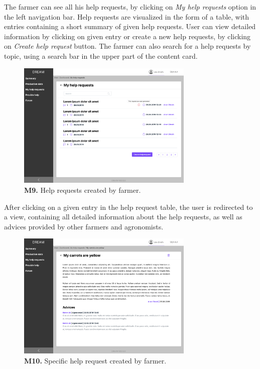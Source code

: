 The farmer can see all his help requests, by clicking on \textit{My help requests} option in the left navigation bar. Help requests are visualized in the form of a table, with entries containing a short summary of given help requests. User can view detailed information by clicking on given entry or create a new help requests, by clicking on \textit{Create help request} button. The farmer can also search for a help requests by topic, using a search bar in the upper part of the content card.
\begin{figure}[H]
    \centering
    \includegraphics[width=0.75\textwidth]{mockups/Farmer_Dashboard_My help requests.png}
    \caption{\textbf{M9.} Help requests created by farmer.}
\end{figure}

After clicking on a given entry in the help request table, the user is redirected to a view, containing all detailed information about the help requests, as well as advices provided by other farmers and agronomists.
\begin{figure}[H]
    \centering
    \includegraphics[width=0.75\textwidth]{mockups/Farmer_Dashboard_My help requests_VIew request.png}
    \caption{\textbf{M10.} Specific help request created by farmer.}
\end{figure}

